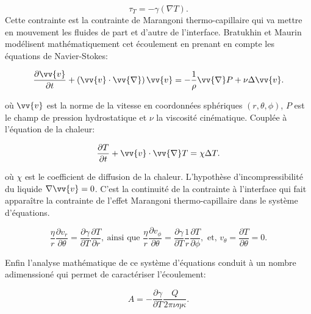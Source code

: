   \begin{equation}
    \tau_{T} = -\gamma\left(\nabla T\right).
  \end{equation}
  Cette contrainte est la contrainte de Marangoni thermo-capillaire qui va mettre en mouvement les fluides de part et d'autre de l'interface. Bratukhin et Maurin modélisent mathématiquement cet écoulement en prenant en compte les équations de Navier-Stokes:

  \begin{equation}
    \dfrac{\partial \vv{v}}{\partial t}+\left(\vv{v}\cdot\vv{\nabla}\right)\vv{v}=-\dfrac{1}{\rho}\vv{\nabla}P+\nu \Delta\vv{v}.
  \end{equation}

  où $\vv{v}$ est la norme de la vitesse en coordonnées sphériques $(r,\theta, \phi)$, $P$ est le champ de pression hydrostatique et $\nu$ la viscosité cinématique. Couplée à l'équation de la chaleur: 

  \begin{equation}
    \frac{\partial T}{\partial t}+\vv{v}\cdot\vv{\nabla}T = \chi \Delta T.
  \end{equation}

  où $\chi$ est le coefficient de diffusion de la chaleur. L'hypothèse d'incompressibilité du liquide $\nabla\vv{v} = 0$. C'est la continuité de la contrainte à l'interface qui fait apparaître la contrainte de l'effet Marangoni thermo-capillaire dans le système d'équations. 

  \begin{equation}
    \dfrac{\eta}{r}\dfrac{\partial v_r}{\partial \theta} = \dfrac{\partial \gamma}{\partial T}\dfrac{\partial T}{\partial r},~\text{ainsi que } \dfrac{\eta}{r}\dfrac{\partial v_\phi}{\partial \theta} = \dfrac{\partial \gamma}{\partial T}\dfrac{1}{r}\dfrac{\partial T}{\partial \phi}, \text{ et, } v_{\theta} = \dfrac{\partial T}{\partial \theta} = 0.
  \end{equation}

  Enfin l'analyse mathématique de ce système d'équations conduit à un nombre adimenssioné qui permet de caractériser l'écoulement: 

  \begin{equation}
    A = -\frac{\partial \gamma}{\partial T}\frac{Q}{2\pi\nu\eta\kappa}\label{eq:bratukhin1967}.
  \end{equation}

